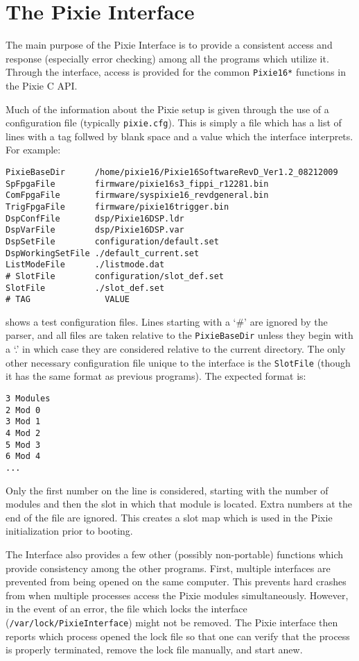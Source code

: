 \documentclass{article}
\begin{document}
\section{\label{sec:pi}The Pixie Interface}
The main purpose of the Pixie Interface is to provide a consistent access and response (especially error checking) among all the programs which utilize it. Through the interface, access is provided for the common \texttt{Pixie16*} functions in the Pixie C API. 

Much of the information about the Pixie setup is given through the use of a configuration file (typically \texttt{pixie.cfg}). This is simply a file which has a list of lines with a tag follwed by blank space and a value which the interface interprets. For example:
\begin{verbatim}
PixieBaseDir      /home/pixie16/Pixie16SoftwareRevD_Ver1.2_08212009
SpFpgaFile        firmware/pixie16s3_fippi_r12281.bin
ComFpgaFile       firmware/syspixie16_revdgeneral.bin
TrigFpgaFile      firmware/pixie16trigger.bin
DspConfFile       dsp/Pixie16DSP.ldr
DspVarFile        dsp/Pixie16DSP.var
DspSetFile        configuration/default.set
DspWorkingSetFile ./default_current.set
ListModeFile      ./listmode.dat
# SlotFile        configuration/slot_def.set
SlotFile          ./slot_def.set
# TAG               VALUE
\end{verbatim}
shows a test configuration files. Lines starting with a `\#' are ignored by the parser, and all files are taken relative to the \texttt{PixieBaseDir} unless they begin with a `.' in which case they are considered relative to the current directory. The only other necessary configuration file unique to the interface is the \texttt{SlotFile} (though it has the same format as previous programs). The expected format is:
\begin{verbatim}
3 Modules
2 Mod 0 
3 Mod 1
4 Mod 2
5 Mod 3
6 Mod 4
...
\end{verbatim}
Only the first number on the line is considered, starting with the number of modules and then the slot in which that module is located. Extra numbers at the end of the file are ignored. This creates a slot map which is used in the Pixie initialization prior to booting.

The Interface also provides a few other (possibly non-portable) functions which provide consistency among the other programs. First, multiple interfaces are prevented from being opened on the same computer. This prevents hard crashes from when multiple processes access the Pixie modules simultaneously. However, in the event of an error, the file which locks the interface (\texttt{/var/lock/PixieInterface}) might not be removed. The Pixie interface then reports which process opened the lock file so that one can verify that the process is properly terminated, remove the lock file manually, and start anew.
\end{document}
